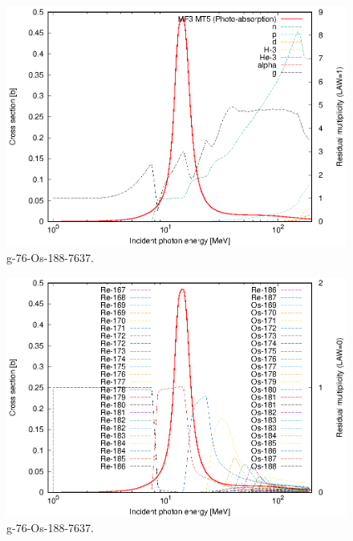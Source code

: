\begin{figure}
 \includegraphics[width=\linewidth]{eps/g_76-Os-188_7637.eps}
  \caption{g-76-Os-188-7637.}
\end{figure}
\begin{figure}
 \includegraphics[width=\linewidth]{eps-law0/g_76-Os-188_7637.eps}
 \caption{g-76-Os-188-7637.}
\end{figure}
\newpage \clearpage

